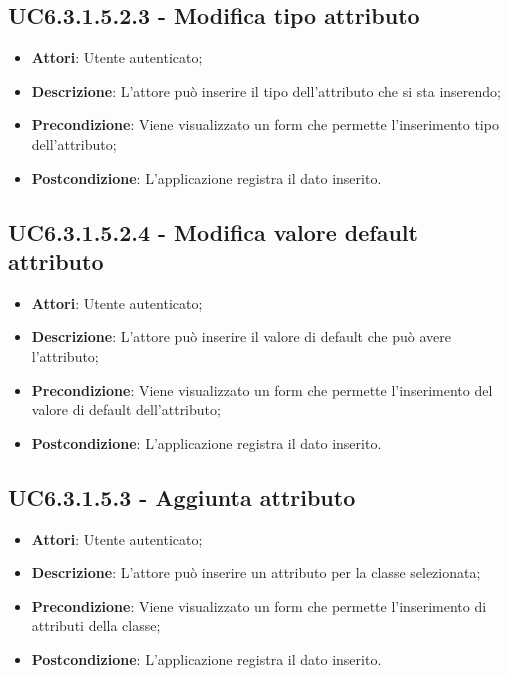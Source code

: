 \subsection{UC6.3.1.5.2.3 - Modifica tipo attributo} 
\label{ssec:UC6.3.1.5.2.3} 
\begin{itemize} 
\item \textbf{Attori}: Utente autenticato;
\item \textbf{Descrizione}: L'attore può inserire il tipo dell'attributo che si sta inserendo;
\item \textbf{Precondizione}: Viene visualizzato un form che permette l'inserimento tipo dell'attributo;
\item \textbf{Postcondizione}: L'applicazione registra il dato inserito.
\end{itemize} 
\subsection{UC6.3.1.5.2.4 - Modifica valore default attributo} 
\label{ssec:UC6.3.1.5.2.4} 
\begin{itemize} 
\item \textbf{Attori}: Utente autenticato;
\item \textbf{Descrizione}: L'attore può inserire il valore di default che può avere l'attributo;
\item \textbf{Precondizione}: Viene visualizzato un form che permette l'inserimento del valore di default dell'attributo;
\item \textbf{Postcondizione}: L'applicazione registra il dato inserito.
\end{itemize} 
\subsection{UC6.3.1.5.3 - Aggiunta attributo} 
\label{ssec:UC6.3.1.5.3} 
\begin{itemize} 
\item \textbf{Attori}: Utente autenticato;
\item \textbf{Descrizione}: L'attore può inserire un attributo per la classe selezionata;
\item \textbf{Precondizione}: Viene visualizzato un form che permette l'inserimento di attributi della classe;
\item \textbf{Postcondizione}: L'applicazione registra il dato inserito.
\end{itemize} 
